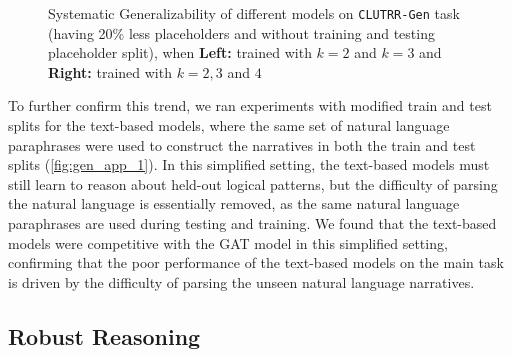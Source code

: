 \documentclass[letterpaper, 12pt]{report}
\begin{document}
\begin{figure}[!ht]
     \centering
    \qquad
    \hspace{-20pt}
    \caption{Systematic Generalizability of different models on \texttt{CLUTRR-Gen} task (having 20\% less placeholders and without training and testing placeholder split), when {\bf Left:} trained with $k=2$ and $k=3$ and {\bf Right:} trained with $k=2,3$ and $4$}%
    \label{fig:gen_app_1}
\end{figure}



To further confirm this trend, we ran experiments with modified train and test splits for the text-based models, where the same set of natural language paraphrases were used to construct the narratives in both the train and test splits (\autoref{fig:gen_app_1}). In this simplified setting, the text-based models must still learn to reason about held-out logical patterns, but the difficulty of parsing the natural language is essentially removed, as the same natural language paraphrases are used during testing and training. We found that the text-based models were competitive with the GAT model in this simplified setting, confirming that the poor performance of the text-based models on the main task is driven by the difficulty of parsing the unseen natural language narratives.

\subsection{Robust Reasoning}
\label{sec:clutrr_robust_reasoning}
\end{document}
